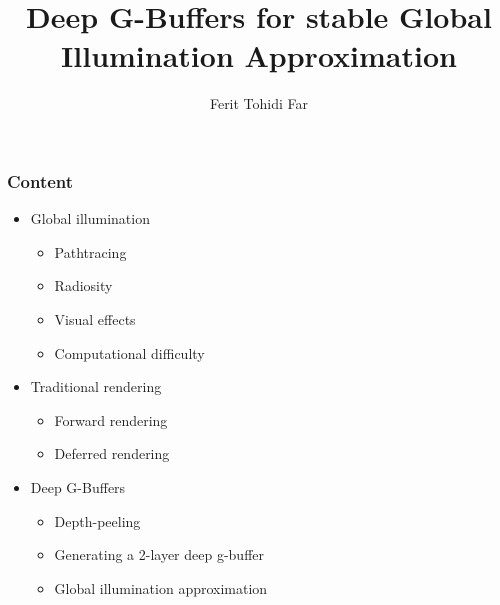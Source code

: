 \documentclass[aspectratio=169]{beamer}
\title{Deep G-Buffers for stable Global Illumination Approximation}
\author{Ferit Tohidi Far}
\begin{document}
	\maketitle

	\begin{frame}
		\frametitle{Content}
		\begin{itemize}
			\item Global illumination
				\begin{itemize}
					\item Pathtracing
					\item Radiosity
					\item Visual effects
					\item Computational difficulty
				\end{itemize}
			\item Traditional rendering
				\begin{itemize}
					\item Forward rendering
					\item Deferred rendering
				\end{itemize}
			\item Deep G-Buffers
				\begin{itemize}
					\item Depth-peeling
					\item Generating a 2-layer deep g-buffer
					\item Global illumination approximation
				\end{itemize}
		\end{itemize}
	\end{frame}
\end{document}
